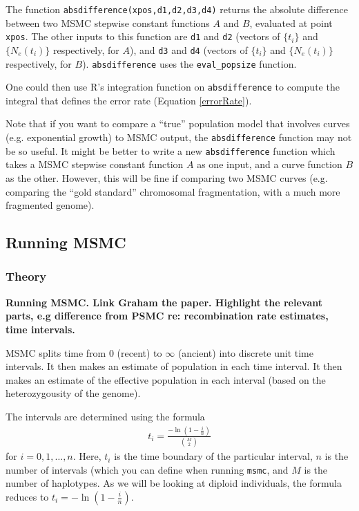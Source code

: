 \documentclass[11pt,a4paper]{article}
\begin{document}
The function \texttt{absdifference(xpos,d1,d2,d3,d4)} returns the absolute difference between two MSMC stepwise constant functions $A$ and $B$, evaluated at point \texttt{xpos}. The other inputs to this function are \texttt{d1} and \texttt{d2} (vectors of $\{t_i\}$ and $\{N_e(t_i)\}$ respectively, for $A$), and \texttt{d3} and \texttt{d4} (vectors of $\{t_i\}$ and $\{N_e(t_i)\}$ respectively, for $B$). \texttt{absdifference} uses the \texttt{eval\_popsize} function.

One could then use R's integration function on \texttt{absdifference} to compute the integral that defines the error rate (Equation \ref{errorRate}).

Note that if you want to compare a ``true''  population model that involves curves (e.g. exponential growth) to MSMC output, the \texttt{absdifference} function may not be so useful. It might be better to write a new \texttt{absdifference} function which takes a MSMC stepwise constant function $A$ as one input, and a curve function $B$ as the other. However, this will be fine if comparing two MSMC curves (e.g. comparing the ``gold standard'' chromosomal fragmentation, with a much more fragmented genome).

\subsection{Running MSMC}
\subsubsection{Theory}

\textbf{Running MSMC. Link Graham the paper. Highlight the relevant parts, e.g difference from PSMC re: recombination rate estimates, time intervals. }

MSMC splits time from 0 (recent) to $\infty$ (ancient) into discrete unit time intervals. It then makes an estimate of population in each time interval. It then makes an estimate of the effective population in each interval (based on the heterozygousity of the genome).

The intervals are determined using the formula
\begin{eqnarray}
  t_i = \frac{-\ln (1-\frac{i}{n})}{{M\choose 2}} \label{timeInts}
\end{eqnarray}
for $i = 0, 1, \dots, n$. Here, $t_i$ is the time boundary of the particular interval, $n$ is the number of intervals (which you can define when running \texttt{msmc}, and $M$ is the number of haplotypes. As we will be looking at diploid individuals, the formula reduces to $t_i = -\ln (1-\frac{i}{n})$.
\end{document}
